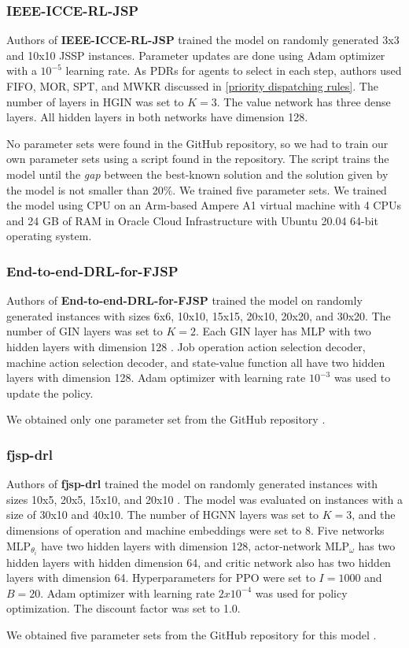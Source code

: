 \subsubsection{IEEE-ICCE-RL-JSP}
Authors of \textbf{IEEE-ICCE-RL-JSP} trained the model on randomly generated 3x3 and 10x10 JSSP instances. Parameter updates are done using Adam optimizer with a $10^{-5}$ learning rate. As PDRs for agents to select in each step, authors used FIFO, MOR, SPT, and MWKR discussed in \ref{priority dispatching rules}. The number of layers in HGIN was set to $K=3$. The value network has three dense layers. All hidden layers in both networks have dimension 128.
\par
No parameter sets were found in the GitHub repository\cite{github_ieee_icce_rl_jsp}, so we had to train our own parameter sets using a script found in the repository. The script trains the model until the \textit{gap} between the best-known solution and the solution given by the model is not smaller than 20$\%$. We trained five parameter sets. We trained the model using CPU on an Arm-based Ampere A1 virtual machine with 4 CPUs and 24 GB of RAM in Oracle Cloud Infrastructure with Ubuntu 20.04 64-bit operating system.

\subsubsection{End-to-end-DRL-for-FJSP}
Authors of \textbf{End-to-end-DRL-for-FJSP} trained the model on randomly generated instances with sizes 6x6, 10x10, 15x15, 20x10, 20x20, and 30x20. The number of GIN layers was set to $K = 2$. Each GIN layer has MLP with two hidden layers with dimension 128 \cite{LEI2022117796}. Job operation action selection decoder, machine action selection decoder, and state-value function all have two hidden layers with dimension 128. Adam optimizer with learning rate $10^{-3}$ was used to update the policy.
\par
We obtained only one parameter set from the GitHub repository \cite{github_end_to_end_drl_for_fjsp}.

\subsubsection{fjsp-drl}
Authors of \textbf{fjsp-drl} trained the model on randomly generated instances with sizes 10x5, 20x5, 15x10, and 20x10 \cite{9826438}. The model was evaluated on instances with a size of 30x10 and 40x10. The number of HGNN layers was set to $K = 3$, and the dimensions of operation and machine embeddings were set to 8. Five networks $\text{MLP}_{\theta_i}$ have two hidden layers with dimension 128, actor-network $\text{MLP}_\omega$ has two hidden layers with hidden dimension 64, and critic network also has two hidden layers with dimension 64. Hyperparameters for PPO were set to $I = 1000$ and $B = 20$. Adam optimizer with learning rate $2x10^{-4}$ was used for policy optimization. The discount factor was set to 1.0.
\par
We obtained five parameter sets from the GitHub repository for this model \cite{github_fjsp_drl}.

